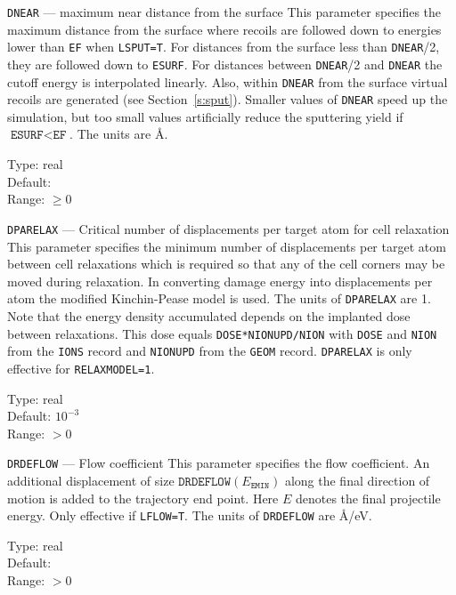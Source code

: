 \begin{keydescription}{\texttt{DNEAR} --- maximum near distance from the
    surface}
%
  This parameter specifies the maximum distance from the surface where recoils
  are followed down to energies lower than \texttt{EF} when \texttt{LSPUT=T}. 
  For distances from the surface less than \texttt{DNEAR}/2, they are followed 
  down to \texttt{ESURF}. For distances between \texttt{DNEAR}/2 and
  \texttt{DNEAR} the cutoff energy is interpolated linearly. Also, within 
  \texttt{DNEAR} from the surface virtual recoils are generated
  (see Section~\ref{s:sput}). Smaller values of \texttt{DNEAR} speed up
  the simulation, but too small values artificially reduce the sputtering 
  yield if $\texttt{ESURF} < \texttt{EF}$. The units are \AA.
  \begin{keytab}
    Type:    \> real \\
    Default:  \\
    Range: \> $\ge 0$
  \end{keytab}
\end{keydescription}

\ifprivate
\begin{keydescription}{\texttt{DPARELAX} --- Critical number of displacements 
per target atom for cell relaxation}
%
  This parameter specifies the minimum number of displacements per target atom  
  between cell relaxations which is required so that any of the cell
  corners may be moved during relaxation. In converting damage energy into 
  displacements per atom the modified Kinchin-Pease model is used. The units of 
  \texttt{DPARELAX} are 1. Note that the energy density accumulated depends on 
  the implanted dose between relaxations. This dose equals 
  \texttt{DOSE*NIONUPD/NION} with \texttt{DOSE} and \texttt{NION} from the 
  \texttt{IONS} record and \texttt{NIONUPD} from the \texttt{GEOM} record. 
  \texttt{DPARELAX} is only effective for \texttt{RELAXMODEL=1}.
  \begin{keytab}
    Type:    \> real \\
    Default: \> $10^{-3}$ \\
    Range:   \> $> 0$
  \end{keytab}
\end{keydescription}

\begin{keydescription}{\texttt{DRDEFLOW} --- Flow coefficient}
%
  This parameter specifies the flow coefficient. An additional displacement
  of size $\texttt{DRDEFLOW}(E_\texttt{EMIN})$ along the final direction of motion 
  is added to the trajectory end point. Here $E$ denotes the final projectile 
  energy. Only effective if \texttt{LFLOW=T}. The units of \texttt{DRDEFLOW} are
  \AA/eV.
  \begin{keytab}
    Type:    \> real \\
    Default:  \\
    Range:   \> $>0$
  \end{keytab}
\end{keydescription}
\fi

